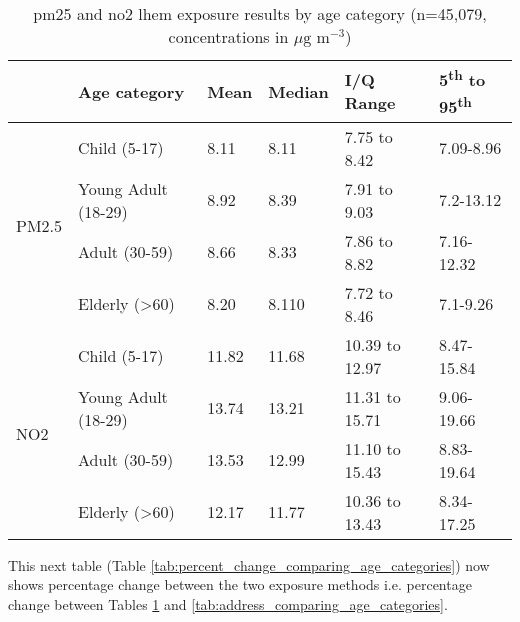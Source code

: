 \begin{table}[H]
\caption{\gls{pm25} and \gls{no2} \gls{lhem} exposure results by age category (n=45,079, concentrations in $\mu \text{g m}^{-3}$)}
\centering
\begin{tabular}{|l|l|l|l|l|l|}
\hline
                       & \bfseries{Age category}  & \bfseries{Mean}  & \bfseries{Median} & \bfseries{I/Q Range} & \bfseries{5\textsuperscript{th} to 95\textsuperscript{th}} \\ \hline
\multirow{4}{*}{PM2.5} & Child (5-17)             & 8.11    & 8.11   & 7.75 to 8.42    & 7.09-8.96 \\ \cline{2-5} 
                       & Young Adult (18-29)      & 8.92    & 8.39   & 7.91 to 9.03    & 7.2-13.12 \\ \cline{2-5} 
                       & Adult (30-59)            & 8.66    & 8.33   & 7.86 to 8.82    & 7.16-12.32 \\ \cline{2-5} 
                       & Elderly (\textgreater60) & 8.20    & 8.110  & 7.72 to 8.46    & 7.1-9.26 \\ \hline
\multirow{4}{*}{NO2}   & Child (5-17)             & 11.82   & 11.68  & 10.39 to 12.97  & 8.47-15.84 \\ \cline{2-5} 
                       & Young Adult (18-29)      & 13.74   & 13.21  & 11.31 to 15.71  & 9.06-19.66 \\ \cline{2-5} 
                       & Adult (30-59)            & 13.53   & 12.99  & 11.10 to 15.43  & 8.83-19.64 \\ \cline{2-5} 
                       & Elderly (\textgreater60) & 12.17   & 11.77  & 10.36 to 13.43  & 8.34-17.25 \\ \hline
\end{tabular}
\label{tab:lhem_comparing_age_categories}
\end{table}

This next table (Table \ref{tab:percent_change_comparing_age_categories}) now shows percentage change between the two exposure methods i.e. percentage change between Tables \ref{tab:lhem_comparing_age_categories} and \ref{tab:address_comparing_age_categories}.

